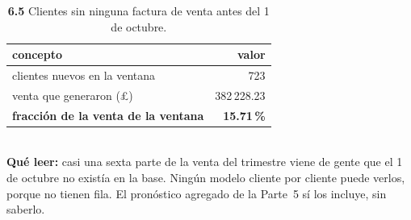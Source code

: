 \begin{table}[htbp]
\centering
\footnotesize
\caption{\textbf{6.5} Clientes sin ninguna factura de venta antes del 1 de octubre.}
\label{tab:p6_nuevos}
\begin{tabular}{lr}
\toprule
\textbf{concepto} & \textbf{valor} \\
\midrule
clientes nuevos en la ventana & 723 \\
venta que generaron (\pounds) & 382\,228.23 \\
\textbf{fracci\'on de la venta de la ventana} & \textbf{15.71\,\%} \\
\bottomrule
\end{tabular}
\\[0.3em]{\scriptsize \textbf{Qu\'e leer:} casi una sexta parte de la venta del trimestre viene de gente que el 1 de octubre no exist\'ia en la base. Ning\'un modelo cliente por cliente puede verlos, porque no tienen fila. El pron\'ostico agregado de la Parte~5 s\'i los incluye, sin saberlo.}
\end{table}
